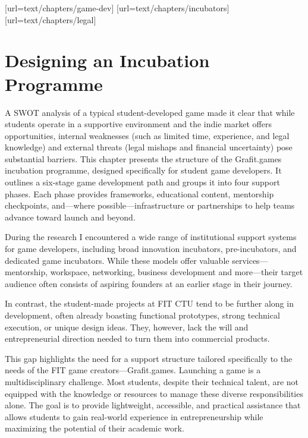 [url=text/chapters/game-dev]
[url=text/chapters/incubators]
[url=text/chapters/legal]
\chapter{Designing an Incubation Programme}

\begin{chapterabstract}
    A SWOT analysis of a typical student-developed game made it clear that while students operate in a supportive environment and the indie market offers opportunities, internal weaknesses (such as limited time, experience, and legal knowledge) and external threats (legal mishaps and financial uncertainty) pose substantial barriers. This chapter presents the structure of the Grafit.games incubation programme, designed specifically for student game developers. It outlines a six-stage game development path and groups it into four support phases. Each phase provides frameworks, educational content, mentorship checkpoints, and—where possible—infrastructure or partnerships to help teams advance toward launch and beyond.
\end{chapterabstract}

During the research I encountered a wide range of institutional support systems for game developers, including broad innovation incubators, pre-incubators, and dedicated game incubators. While these models offer valuable services—mentorship, workspace, networking, business development and more—their target audience often consists of aspiring founders at an earlier stage in their journey.

In contrast, the student-made projects at FIT CTU tend to be further along in development, often already boasting functional prototypes, strong technical execution, or unique design ideas. They, however, lack the will and entrepreneurial direction needed to turn them into commercial products.

This gap highlights the need for a support structure tailored specifically to the needs of the FIT game creators—Grafit.games. Launching a game is a multidisciplinary challenge. Most students, despite their technical talent, are not equipped with the knowledge or resources to manage these diverse responsibilities alone. The goal is to provide lightweight, accessible, and practical assistance that allows students to gain real-world experience in entrepreneurship while maximizing the potential of their academic work.

